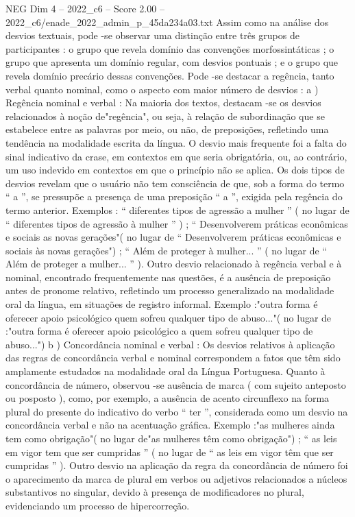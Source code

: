 \begin{textsample}{NEG Dim 4 – 2022\_c6 – Score 2.00 – 2022\_c6/enade\_2022\_admin\_p\_45da234a03.txt}
Assim como na análise dos desvios textuais, pode -se observar uma distinção entre três grupos de participantes : o grupo que revela domínio das convenções morfossintáticas ; o grupo que apresenta um domínio regular, com desvios pontuais ; e o grupo que revela domínio precário dessas convenções.
Pode -se destacar a regência, tanto verbal quanto nominal, como o aspecto com maior número de desvios : a ) Regência nominal e verbal : Na maioria dos textos, destacam -se os desvios relacionados à noção de"regência", ou seja, à relação de subordinação que se estabelece entre as palavras por meio, ou não, de preposições, refletindo uma tendência na modalidade escrita da língua.
O desvio mais frequente foi a falta do sinal indicativo da crase, em contextos em que seria obrigatória, ou, ao contrário, um uso indevido em contextos em que o princípio não se aplica.
Os dois tipos de desvios revelam que o usuário não tem consciência de que, sob a forma do termo “ a ”, se pressupõe a presença de uma preposição “ a ”, exigida pela regência do termo anterior.
Exemplos : “ diferentes tipos de agressão a mulher ” ( no lugar de “ diferentes tipos de agressão à mulher ” ) ; “ Desenvolverem práticas econômicas e sociais as novas gerações"( no lugar de “ Desenvolverem práticas econômicas e sociais às novas gerações") ; “ Além de proteger à mulher... ” ( no lugar de “ Além de proteger a mulher... ” ).
Outro desvio relacionado à regência verbal e à nominal, encontrado frequentemente nas questões, é a ausência de preposição antes de pronome relativo, refletindo um processo generalizado na modalidade oral da língua, em situações de registro informal.
Exemplo :"outra forma é oferecer apoio psicológico quem sofreu qualquer tipo de abuso..."( no lugar de :"outra forma é oferecer apoio psicológico a quem sofreu qualquer tipo de abuso...") b ) Concordância nominal e verbal : Os desvios relativos à aplicação das regras de concordância verbal e nominal correspondem a fatos que têm sido amplamente estudados na modalidade oral da Língua Portuguesa.
Quanto à concordância de número, observou -se ausência de marca ( com sujeito anteposto ou posposto ), como, por exemplo, a ausência de acento circunflexo na forma plural do presente do indicativo do verbo “ ter ”, considerada como um desvio na concordância verbal e não na acentuação gráfica.
Exemplo :"as mulheres ainda tem como obrigação"( no lugar de"as mulheres têm como obrigação") ; “ as leis em vigor tem que ser cumpridas ” ( no lugar de “ as leis em vigor têm que ser cumpridas ” ).
Outro desvio na aplicação da regra da concordância de número foi o aparecimento da marca de plural em verbos ou adjetivos relacionados a núcleos substantivos no singular, devido à presença de modificadores no plural, evidenciando um processo de hipercorreção.

\end{textsample}
